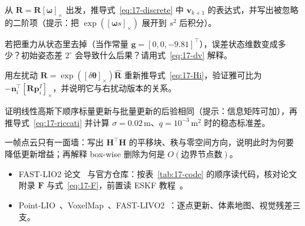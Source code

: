 \begin{problemset}

  \item 从 $\dot{\bm{R}}=\bm{R}[\bm{\omega}]_\times$ 出发，推导式~\eqref{eq:17-discrete} 中 $\bm{v}_{k+1}$ 的表达式，并写出被忽略的二阶项（提示：把 $\exp([\bm{\omega}s]_\times)$ 展开到 $s^2$ 后积分）。
  \item 若把重力从状态里去掉（当作常量 $\bm{g}=[0,0,-9.81]^{\top}$），误差状态维数变成多少？初始姿态差 $2^{\circ}$ 会导致什么后果？请用式~\eqref{eq:17-dv} 解释。
  \item 用左扰动 $\bm{R}=\exp([\delta\bm{\theta}]_\times)\hat{\bm{R}}$ 重新推导式~\eqref{eq:17-Hi}，验证雅可比为 $-\bm{n}_i^{\top}[\bm{R}\bm{p}_i^{I}]_\times$，并说明它与右扰动版本的关系。
  \item 证明线性高斯下顺序标量更新与批量更新的后验相同（提示：信息矩阵可加），再推导式~\eqref{eq:17-riccati} 并计算 $\sigma=0.02$\,m、$q=10^{-3}\,\mathrm{m^2}$ 时的稳态标准差。
  \item 一帧点云只有一面墙：写出 $\bm{H}^{\top}\bm{H}$ 的平移块、秩与零空间方向，说明此时为何要降低更新增益；再解释 box-wise 删除为何是 $O(\text{边界节点数})$。
\end{problemset}

\begin{reading}

\begin{itemize}
  \item FAST-LIO2 论文~\cite{xu2022fastlio2} 与官方仓库：按表~\ref{tab:17-code} 的顺序读代码，核对论文附录 $\bm{F}$ 与式~\eqref{eq:17-F}，前置读 ESKF 教程~\cite{sola2017eskf}。
  \item Point-LIO~\cite{he2023pointlio}、VoxelMap~\cite{yuan2022voxelmap}、FAST-LIVO2~\cite{yuan2024fastlivo2}：逐点更新、体素地图、视觉残差三支。
\end{itemize}



\end{reading}
